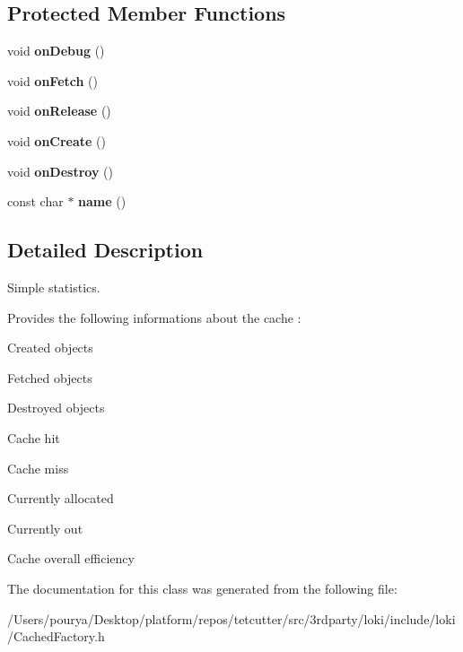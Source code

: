 \subsection*{Protected Member Functions}
\begin{DoxyCompactItemize}
\item 
\hypertarget{classLoki_1_1SimpleStatisticPolicy_a1f021b071b79b5eba68e43e0a4537a9e}{}void {\bfseries on\+Debug} ()\label{classLoki_1_1SimpleStatisticPolicy_a1f021b071b79b5eba68e43e0a4537a9e}

\item 
\hypertarget{classLoki_1_1SimpleStatisticPolicy_ab66f45af9159f727a0d45fe1e3b0ad6d}{}void {\bfseries on\+Fetch} ()\label{classLoki_1_1SimpleStatisticPolicy_ab66f45af9159f727a0d45fe1e3b0ad6d}

\item 
\hypertarget{classLoki_1_1SimpleStatisticPolicy_a89144cf94d0764e80c9c3cfe17b3211b}{}void {\bfseries on\+Release} ()\label{classLoki_1_1SimpleStatisticPolicy_a89144cf94d0764e80c9c3cfe17b3211b}

\item 
\hypertarget{classLoki_1_1SimpleStatisticPolicy_afb90a2e7e0d10a482d725510eaefc374}{}void {\bfseries on\+Create} ()\label{classLoki_1_1SimpleStatisticPolicy_afb90a2e7e0d10a482d725510eaefc374}

\item 
\hypertarget{classLoki_1_1SimpleStatisticPolicy_af29de3495a92e6ae125a1560386a1328}{}void {\bfseries on\+Destroy} ()\label{classLoki_1_1SimpleStatisticPolicy_af29de3495a92e6ae125a1560386a1328}

\item 
\hypertarget{classLoki_1_1SimpleStatisticPolicy_aaff6ca5b674d26e3e5e06ab2d25c62e1}{}const char $\ast$ {\bfseries name} ()\label{classLoki_1_1SimpleStatisticPolicy_aaff6ca5b674d26e3e5e06ab2d25c62e1}

\end{DoxyCompactItemize}


\subsection{Detailed Description}
Simple statistics. 

Provides the following informations about the cache \+:
\begin{DoxyItemize}
\item Created objects
\item Fetched objects
\item Destroyed objects
\item Cache hit
\item Cache miss
\item Currently allocated
\item Currently out
\item Cache overall efficiency 
\end{DoxyItemize}

The documentation for this class was generated from the following file\+:\begin{DoxyCompactItemize}
\item 
/\+Users/pourya/\+Desktop/platform/repos/tetcutter/src/3rdparty/loki/include/loki/Cached\+Factory.\+h\end{DoxyCompactItemize}
